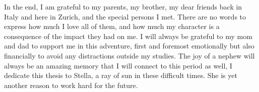 In the end, I am grateful to my parents, my brother, my dear friends back in Italy and here in Zurich, and the special persons I met. There are no words to express how much I love all of them, and how much my character is a consequence of the impact they had on me. I will always be grateful to my mom and dad to support me in this adventure, first and foremost emotionally but also financially to avoid any distractions outside my studies. The joy of a nephew will always be an amazing memory that I will connect to this period as well, I dedicate this thesis to Stella, a ray of sun in these difficult times. She is yet another reason to work hard for the future.